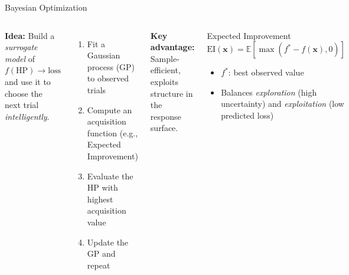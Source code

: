 \documentclass[aspectratio=169,11pt]{beamer}
\newcommand{\emphc}[1]{\textcolor{harvardcrimson}{#1}}
\newcommand{\x}{\bm{x}}
\newcommand{\E}[1]{\mathbb{E}\!\left[#1\right]}
\begin{document}
\begin{frame}{Bayesian Optimization}
\begin{columns}[T]
\textbf{Idea:} Build a \emph{surrogate model} of $f(\text{HP}) \to \text{loss}$ and use it to choose the next trial \emph{intelligently}.

\vspace{0.3cm}
\begin{enumerate}
    \item Fit a Gaussian process (GP) to observed trials
    \item Compute an \emphc{acquisition function} (e.g., Expected Improvement)
    \item Evaluate the HP with highest acquisition value
    \item Update the GP and repeat
\end{enumerate}

\vspace{0.3cm}
\textbf{Key advantage:} \emphc{Sample-efficient}, exploits structure in the response surface.

\begin{block}{Expected Improvement}
\vspace{-0.2cm}
\[
    \text{EI}(\x) = \E{\max(f^* - f(\x), 0)}
\]
\vspace{-0.2cm}
\begin{itemize}
    \item $f^*$: best observed value
    \item Balances \emph{exploration} (high uncertainty) and \emph{exploitation} (low predicted loss)
\end{itemize}
\end{block}
\end{columns}
\end{frame}
\end{document}

